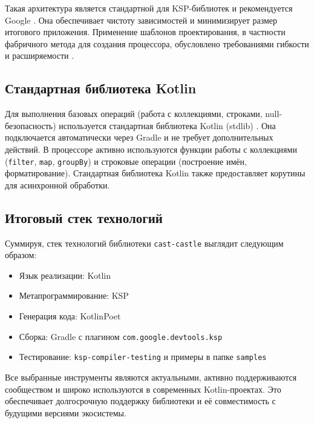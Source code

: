 Такая архитектура является стандартной для KSP-библиотек и рекомендуется Google \cite{refc}. Она обеспечивает чистоту зависимостей и минимизирует размер итогового приложения. Применение шаблонов проектирования, в частности фабричного метода для создания процессора, обусловлено требованиями гибкости и расширяемости \cite{refe}.

\subsection{Стандартная библиотека Kotlin}

Для выполнения базовых операций (работа с коллекциями, строками, null-безопасность) используется стандартная библиотека Kotlin (stdlib) \cite{refa}. Она подключается автоматически через Gradle и не требует дополнительных действий. В процессоре активно используются функции работы с коллекциями (\texttt{filter}, \texttt{map}, \texttt{groupBy}) и строковые операции (построение имён, форматирование). Стандартная библиотека Kotlin также предоставляет корутины для асинхронной обработки.

\subsection{Итоговый стек технологий}

Суммируя, стек технологий библиотеки \texttt{cast-castle} выглядит следующим образом:

\begin{itemize}
    \item Язык реализации: Kotlin \cite{refa}
    \item Метапрограммирование: KSP \cite{refg, refj}
    \item Генерация кода: KotlinPoet \cite{refk}
    \item Сборка: Gradle \cite{refm} с плагином \texttt{com.google.devtools.ksp}
    \item Тестирование: \texttt{ksp-compiler-testing} и примеры в папке \texttt{samples}
\end{itemize}

Все выбранные инструменты являются актуальными, активно поддерживаются сообществом и широко используются в современных Kotlin-проектах. Это обеспечивает долгосрочную поддержку библиотеки и её совместимость с будущими версиями экосистемы.
